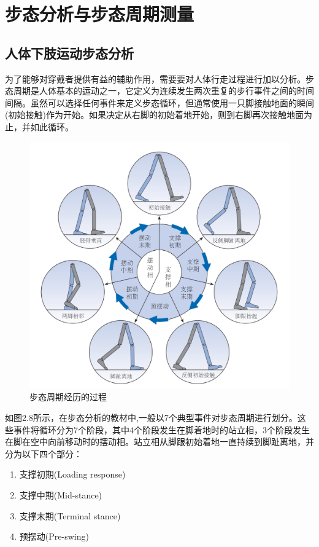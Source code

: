 \section{步态分析与步态周期测量}
\subsection{人体下肢运动步态分析}

为了能够对穿戴者提供有益的辅助作用，需要要对人体行走过程进行加以分析。步态周期是人体基本的运动之一，它定义为连续发生两次重复的步行事件之间的时间间隔。虽然可以选择任何事件来定义步态循环，但通常使用一只脚接触地面的瞬间(初始接触)作为开始。如果决定从右脚的初始着地开始，则到右脚再次接触地面为止，并如此循环。

\begin{figure}[htb]
    \includegraphics[width=14cm]{fig/f29.jpg}
    \caption{步态周期经历的过程}
    \label{fig:mark}
\end{figure}

如图2.8所示，在步态分析的教材\cite{p44}中,一般以7个典型事件对步态周期进行划分。这些事件将循环分为7个阶段，其中4个阶段发生在脚着地时的站立相，3个阶段发生在脚在空中向前移动时的摆动相。站立相从脚跟初始着地一直持续到脚趾离地，并分为以下四个部分：
\begin{enumerate}
    \item 支撑初期(Loading response)
    \item 支撑中期(Mid-stance)
    \item 支撑末期(Terminal stance)
    \item 预摆动(Pre-swing)
\end{enumerate}

